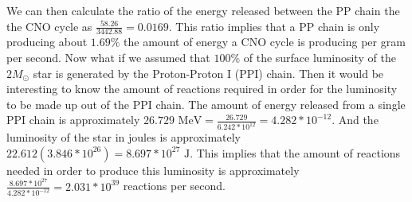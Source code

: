 \documentclass{article}
\begin{document}
\begin{multicols}{2}

We can then calculate the ratio of the energy released between the PP chain the the CNO cycle as $\frac{58.26}{3442.88} = 0.0169$. This ratio implies that a PP chain is only producing about $1.69\%$ the amount of energy a CNO cycle is producing per gram per second. Now what if we assumed that $100\%$ of the surface luminosity of the $2M_\odot$ star is generated by the Proton-Proton I (PPI) chain. Then it would be interesting to know the amount of reactions required in order for the luminosity to be made up out of the PPI chain. The amount of energy released from a single PPI chain is approximately $26.729 \text{ MeV} = \frac{26.729}{6.242*10^{12}} = 4.282*10^{-12}$. And the luminosity of the star in joules is approximately $22.612(3.846*10^{26}) = 8.697*10^{27}\text{ J}$. This implies that the amount of reactions needed in order to produce this luminosity is approximately $\frac{8.697*10^{27}}{4.282*10^{-12}} = 2.031*10^{39}$ reactions per second. 

\end{multicols}
\end{document}

